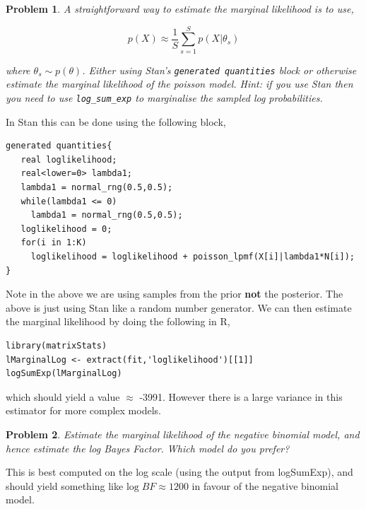 \documentclass{article}
\newtheorem{problem}{Problem}[section]
\begin{document}
\begin{problem}
	A straightforward way to estimate the marginal likelihood is to use,
	
	\begin{equation}
	p(X) \approx \frac{1}{S} \sum_{s=1}^S p(X|\theta_s)
	\end{equation}
	
	where $\theta_s\sim p(\theta)$. Either using Stan's \texttt{generated quantities} block or otherwise estimate the marginal likelihood of the poisson model. Hint: if you use Stan then you need to use \texttt{log_sum_exp} to marginalise the sampled log probabilities.
\end{problem}

In Stan this can be done using the following block,

\begin{verbatim}
generated quantities{
   real loglikelihood;
   real<lower=0> lambda1;
   lambda1 = normal_rng(0.5,0.5);
   while(lambda1 <= 0)
     lambda1 = normal_rng(0.5,0.5);
   loglikelihood = 0;
   for(i in 1:K)
     loglikelihood = loglikelihood + poisson_lpmf(X[i]|lambda1*N[i]);
}
\end{verbatim}

Note in the above we are using samples from the prior \textbf{not} the posterior. The above is just using Stan like a random number generator. We can then estimate the marginal likelihood by doing the following in R,

\begin{verbatim}
library(matrixStats)
lMarginalLog <- extract(fit,'loglikelihood')[[1]]
logSumExp(lMarginalLog)
\end{verbatim}

which should yield a value $\approx$ -3991. However there is a large variance in this estimator for more complex models.

\begin{problem}
	Estimate the marginal likelihood of the negative binomial model, and hence estimate the log Bayes Factor. Which model do you prefer?
\end{problem}

This is best computed on the log scale (using the output from logSumExp), and should yield something like $\text{log}\;BF\approx 1200$ in favour of the negative binomial model. 

 

\end{document}
